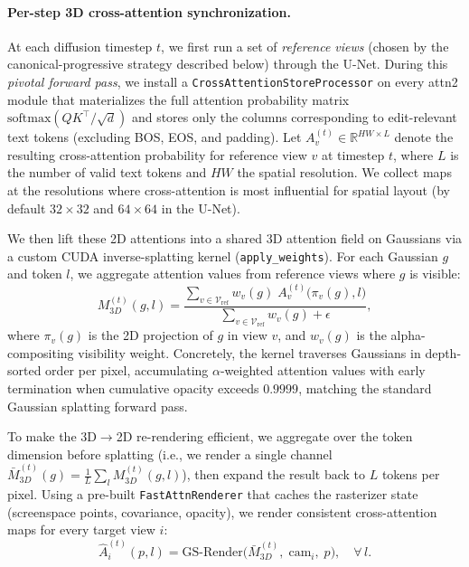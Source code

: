 \paragraph{Per-step 3D cross-attention synchronization.}
At each diffusion timestep $t$, we first run a set of \emph{reference views} (chosen by the canonical-progressive strategy described below) through the U-Net.
During this \emph{pivotal forward pass}, we install a \texttt{CrossAttentionStoreProcessor} on every attn2 module that materializes the full attention probability matrix $\mathrm{softmax}(QK^\top/\!\sqrt{d})$ and stores only the columns corresponding to edit-relevant text tokens (excluding BOS, EOS, and padding).
Let $A_v^{(t)} \in \mathbb{R}^{HW \times L}$ denote the resulting cross-attention probability for reference view $v$ at timestep $t$, where $L$ is the number of valid text tokens and $HW$ the spatial resolution.
We collect maps at the resolutions where cross-attention is most influential for spatial layout (by default $32{\times}32$ and $64{\times}64$ in the U-Net).

We then lift these 2D attentions into a shared 3D attention field on Gaussians via a custom CUDA inverse-splatting kernel (\texttt{apply\_weights}).
For each Gaussian $g$ and token $l$, we aggregate attention values from reference views where $g$ is visible:
\begin{equation}
M_{3D}^{(t)}(g,l)
=
\frac{\sum_{v \in \mathcal{V}_{\mathrm{ref}}} w_v(g)\; A_v^{(t)}\!\bigl(\pi_v(g), l\bigr)}
     {\sum_{v \in \mathcal{V}_{\mathrm{ref}}} w_v(g) + \epsilon},
\label{eq:3d_lift}
\end{equation}
where $\pi_v(g)$ is the 2D projection of $g$ in view $v$, and $w_v(g)$ is the alpha-compositing visibility weight.
Concretely, the kernel traverses Gaussians in depth-sorted order per pixel, accumulating $\alpha$-weighted attention values with early termination when cumulative opacity exceeds $0.9999$, matching the standard Gaussian splatting forward pass.

To make the 3D$\to$2D re-rendering efficient, we aggregate over the token dimension before splatting (i.e., we render a single channel $\bar{M}_{3D}^{(t)}(g) = \frac{1}{L}\sum_l M_{3D}^{(t)}(g,l)$), then expand the result back to $L$ tokens per pixel.
Using a pre-built \texttt{FastAttnRenderer} that caches the rasterizer state (screenspace points, covariance, opacity), we render consistent cross-attention maps for every target view $i$:
\begin{equation}
\hat{A}_i^{(t)}(p, l) = \mathrm{GS\text{-}Render}\!\bigl(\bar{M}_{3D}^{(t)},\;\mathrm{cam}_i,\;p\bigr), \quad \forall\, l.
\label{eq:3d_render}
\end{equation}

